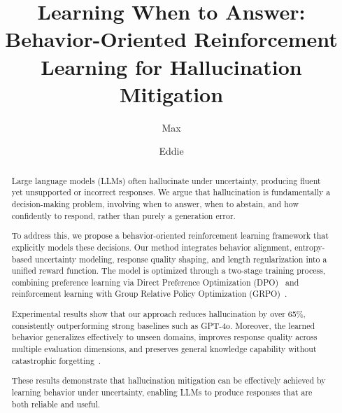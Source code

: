 \documentclass[11pt]{article}
\title{Learning When to Answer: Behavior-Oriented Reinforcement Learning for Hallucination Mitigation}
\author{Max \and Eddie}
\begin{document}
\maketitle

\begin{abstract}
Large language models (LLMs) often hallucinate under uncertainty, producing fluent yet unsupported or incorrect responses. 
We argue that hallucination is fundamentally a decision-making problem, involving when to answer, when to abstain, and how confidently to respond, rather than purely a generation error.

To address this, we propose a behavior-oriented reinforcement learning framework that explicitly models these decisions. 
Our method integrates behavior alignment, entropy-based uncertainty modeling, response quality shaping, and length regularization into a unified reward function. 
The model is optimized through a two-stage training process, combining preference learning via Direct Preference Optimization (DPO)~\cite{dpo} and reinforcement learning with Group Relative Policy Optimization (GRPO)~\cite{GRPO}.

Experimental results show that our approach reduces hallucination by over 65\%, consistently outperforming strong baselines such as GPT-4o. 
Moreover, the learned behavior generalizes effectively to unseen domains, improves response quality across multiple evaluation dimensions, and preserves general knowledge capability without catastrophic forgetting~\cite{EWC}.

These results demonstrate that hallucination mitigation can be effectively achieved by learning behavior under uncertainty, enabling LLMs to produce responses that are both reliable and useful.
\end{abstract}








\end{document}
